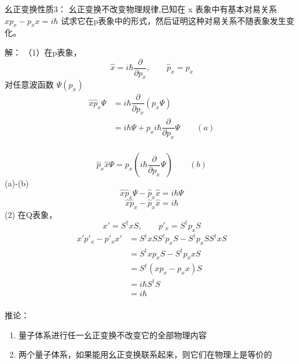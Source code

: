 \begin{frame} 
    \begin{tcolorbox1}{幺正变换性质3：}
        幺正变换不改变物理规律,已知在 x 表象中有基本对易关系$xp_x-p_x x =i\hbar$ 试求它在p表象中的形式，然后证明这种对易关系不随表象发生变化。
    \end{tcolorbox1}
    \alert{解：} （1）在p表象， $$ \hat{x}=i\hbar\dfrac{\partial}{\partial p_x}, \qquad \hat{p}_x=p_x $$
     对任意波函数 $\Psi(p_x)$
    \begin{equation*}
        \begin{split}
            \hat{x}\hat{p}_x\Psi &= i\hbar\dfrac{\partial}{\partial p_x} (p_x \Psi )\\
            &= i\hbar\Psi + p_xi\hbar\dfrac{\partial}{\partial p_x}\Psi \qquad (a)\\
        \end{split} 
    \end{equation*} 

\end{frame}  
\begin{frame} 
    $$\hat{p}_x\hat{x}\Psi = p_x(i\hbar\dfrac{\partial}{\partial p_x}\Psi) \qquad (b)$$
    (a)-(b)
    $$\hat{x}\hat{p}_x\Psi-\hat{p}_x\hat{x}=i\hbar\Psi$$
    $$\hat{x}\hat{p}_x-\hat{p}_x\hat{x}=i\hbar$$
    (2) 在Q表象，$$ x'= S^\dagger x S, \qquad p'_x= S^\dagger p_x S $$
    \begin{equation*}
        \begin{split}
        x'p'_x-p'_x x' &= S^\dagger x S S^\dagger p_x S - S^\dagger p_x S S^\dagger x S \\
        &= S^\dagger x p_x S - S^\dagger p_x x S \\
        &= S^\dagger (x p_x -  p_x x) S \\
        &= i\hbar S^\dagger S \\
        &= i\hbar \\
        \end{split} 
    \end{equation*} 
\end{frame}  
\begin{frame}
    \begin{tcolorbox2}{推论：}
       \begin{enumerate}
           \item 量子体系进行任一幺正变换不改变它的全部物理内容
           \item 两个量子体系，如果能用幺正变换联系起来，则它们在物理上是等价的
       \end{enumerate} 
    \end{tcolorbox2}
\end{frame}

